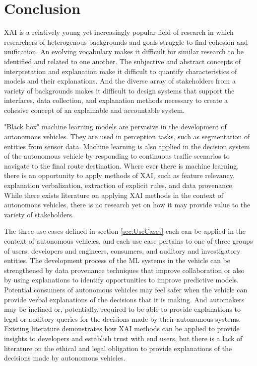 \section{Conclusion}

XAI is a relatively young yet increasingly popular field of research in which researchers of heterogenous backgrounds and goals struggle to find cohesion and unification.  An evolving vocabulary makes it difficult for similar research to be identified and related to one another.  The subjective and abstract concepts of interpretation and explanation make it difficult to quantify characteristics of models and their explanations.  And the diverse array of stakeholders from a variety of backgrounds makes it difficult to design systems that support the interfaces, data collection, and explanation methods necessary to create a cohesive concept of an explainable and accountable system.

"Black box" machine learning models are pervasive in the development of autonomous vehicles.  They are used in perception tasks, such as segmentation of entities from sensor data.  Machine learning is also applied in the decision system of the autonomous vehicle by responding to continuous traffic scenarios to navigate to the final route destination.  Where ever there is machine learning, there is an opportunity to apply methods of XAI, such as feature relevancy, explanation verbalization, extraction of explicit rules, and data provenance.  While there exists literature on applying XAI methods in the context of autonomous vehicles, there is no research yet on how it may provide value to the variety of stakeholders.

The three use cases defined in section \ref{sec:UseCases} each can be applied in the context of autonomous vehicles, and each use case pertains to one of three groups of users: developers and engineers, consumers, and auditory and investigatory entities.  The development process of the ML systems in the vehicle can be strengthened by data provenance techniques that improve collaboration or also by using explanations to identify opportunities to improve predictive models.  Potential consumers of autonomous vehicles may feel safer when the vehicle can provide verbal explanations of the decisions that it is making.  And automakers may be inclined or, potentially, required to be able to provide explanations to legal or auditory queries for the decisions made by their autonomous systems.  Existing literature demonstrates how XAI methods can be applied to provide insights to developers and establish trust with end users, but there is a lack of literature on the ethical and legal obligation to provide explanations of the decisions made by autonomous vehicles.

